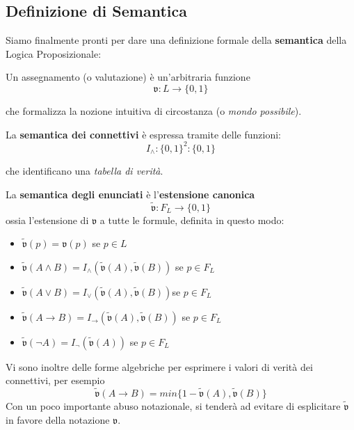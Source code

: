 \subsection{Definizione di Semantica}
Siamo finalmente pronti per dare una definizione formale della 
\textbf{semantica} della Logica Proposizionale: 
\begin{defi}
Un assegnamento (o valutazione) è un'arbitraria funzione 
$$
\mathfrak{v} : L \rightarrow \{0,1\}
$$ 
\end{defi}
che formalizza la nozione intuitiva di circostanza (o \textit{mondo possibile}). 

\begin{defi}
        La \textbf{semantica dei connettivi} è espressa tramite delle funzioni:
$$
I_{\land} : \{0,1\}^2 : \{0,1\}
$$
\end{defi}
che identificano una \textit{tabella di verità}.

\begin{defi}
        La \textbf{semantica degli enunciati} è l'\textbf{estensione canonica}
$$
\widetilde{\mathfrak{v}}: F_L \rightarrow \{0,1\}
$$
ossia l'estensione di $\mathfrak{v}$ a tutte le formule, definita in questo modo: 
\begin{itemize}
  \item $\widetilde{\mathfrak{v}}(p) = \mathfrak{v}(p)$ se $p \in L$
  \item $\widetilde{\mathfrak{v}}(A \land B) = I_{\land}(\widetilde{\mathfrak{v}}(A), \widetilde{\mathfrak{v}}(B))$ se $p \in F_L$
  \item $\widetilde{\mathfrak{v}}(A \lor B) = I_{\lor}(\widetilde{\mathfrak{v}}(A), \widetilde{\mathfrak{v}}(B))$se $p \in F_L$
  \item $\widetilde{\mathfrak{v}}(A \rightarrow B) = I_{\rightarrow}(\widetilde{\mathfrak{v}}(A), \widetilde{\mathfrak{v}}(B))$ se $p \in F_L$
  \item $\widetilde{\mathfrak{v}}(\neg A) = I_{\neg}(\widetilde{\mathfrak{v}}(A))$ se $p \in F_L$
\end{itemize}
\end{defi}

Vi sono inoltre delle forme algebriche per esprimere i valori di verità dei connettivi, 
per esempio 
$$
\widetilde{\mathfrak{v}}(A \rightarrow B) = min\{1-\widetilde{\mathfrak{v}}(A), \widetilde{\mathfrak{v}}(B)\}
$$
Con un poco importante abuso notazionale, si tenderà ad evitare di esplicitare 
$\widetilde{\mathfrak{v}}$ in favore della notazione $\mathfrak{v}$.
